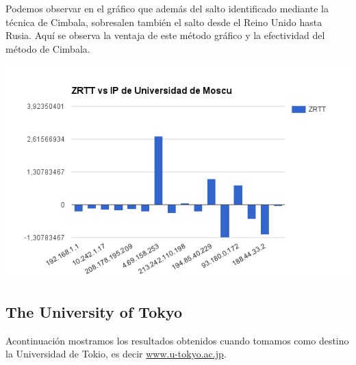 Podemos observar en el gráfico que además del salto identificado mediante la técnica de Cimbala, sobresalen también el salto desde el Reino Unido hasta Rusia. Aquí se observa la ventaja de este método gráfico y la efectividad del método de Cimbala. 

\begin{center}
\includegraphics[width=\textwidth]{imgs/moscu.png}
\end{center}


\subsection{The University of Tokyo}
Acontinuación mostramos los resultados obtenidos cuando tomamos como destino la
Universidad de Tokio, es decir \url{www.u-tokyo.ac.jp}.

